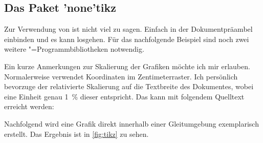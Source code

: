 \documentclass[%
  english,ngerman,%
  cdgeometry=no,DIV=12,%
  cd=false,cdfont=false,cdtitle=true,%
  headings=normal,%
  automark,%
  listof=toc,%
]{tudscrartcl}
\begin{document}
\subsection{Das Paket \Package'none'{tikz}}

Zur Verwendung von  ist nicht viel zu sagen. Einfach in der 
Dokumentpräambel einbinden und es kann losgehen. Für das nachfolgende Beispiel 
sind noch zwei weitere "=Programmbibliotheken notwendig.
%
\begin{Hint}
\usepackage{tikz}
\usetikzlibrary{chains}
\usetikzlibrary{decorations.markings}
\tikzset{on grid}
\end{Hint}
%
Ein kurze Anmerkungen zur Skalierung der Grafiken möchte ich mir erlauben. 
Normalerweise verwendet  Koordinaten im Zentimeterraster. Ich 
persönlich bevorzuge der relativierte Skalierung auf die Textbreite des 
Dokumentes, wobei eine Einheit genau \SI{1}{\percent} dieser entspricht. Das 
kann mit folgendem Quelltext erreicht werden:
%
\CodeHook{\renewcommand\newlength[1]{}}
\begin{Hint*}
\newlength{\tikzunit}
\setlength{\tikzunit}{.01\textwidth}
\tikzset{x=\tikzunit,y=\tikzunit}
\end{Hint*}
%
Nachfolgend wird eine Grafik direkt innerhalb einer Gleitumgebung exemplarisch 
erstellt. Das Ergebnis ist in \autoref{fig:tikz} zu sehen.
\end{document}
